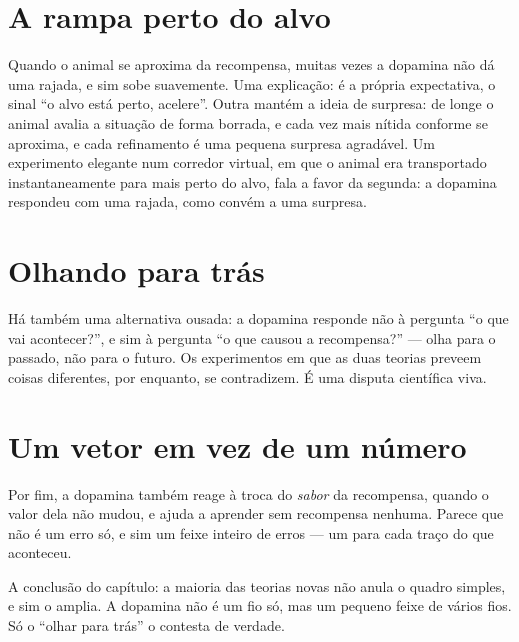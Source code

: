 \section*{A rampa perto do alvo}

Quando o animal se aproxima da recompensa, muitas vezes a dopamina não dá uma rajada, e sim sobe suavemente. Uma explicação: é a própria expectativa, o sinal ``o alvo está perto, acelere''. Outra mantém a ideia de surpresa: de longe o animal avalia a situação de forma borrada, e cada vez mais nítida conforme se aproxima, e cada refinamento é uma pequena surpresa agradável. Um experimento elegante num corredor virtual, em que o animal era transportado instantaneamente para mais perto do alvo, fala a favor da segunda: a dopamina respondeu com uma rajada, como convém a uma surpresa.

\section*{Olhando para trás}

Há também uma alternativa ousada: a dopamina responde não à pergunta ``o que vai acontecer?'', e sim à pergunta ``o que causou a recompensa?'' --- olha para o passado, não para o futuro. Os experimentos em que as duas teorias preveem coisas diferentes, por enquanto, se contradizem. É uma disputa científica viva.

\section*{Um vetor em vez de um número}

Por fim, a dopamina também reage à troca do \emph{sabor} da recompensa, quando o valor dela não mudou, e ajuda a aprender sem recompensa nenhuma. Parece que não é um erro só, e sim um feixe inteiro de erros --- um para cada traço do que aconteceu.

A conclusão do capítulo: a maioria das teorias novas não anula o quadro simples, e sim o amplia. A dopamina não é um fio só, mas um pequeno feixe de vários fios. Só o ``olhar para trás'' o contesta de verdade.

